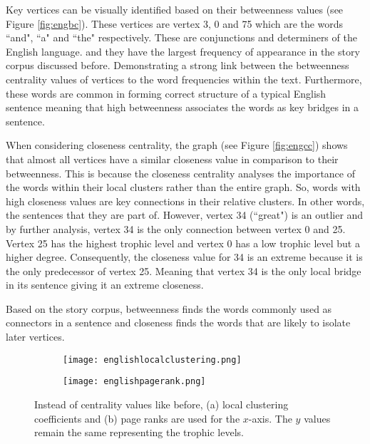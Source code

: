Key vertices can be visually identified based on their betweenness values (see Figure \ref{fig:engbc}). These vertices are vertex 3, 0 and 75 which are the words ``and", ``a" and ``the" respectively. These are conjunctions and determiners of the English language. and they have the largest frequency of appearance in the story corpus discussed before. Demonstrating a strong link between the betweenness centrality values of vertices to the word frequencies within the text. Furthermore, these words are common in forming correct structure of a typical English sentence meaning that high betweenness associates the words as key bridges in a sentence. 

When considering closeness centrality, the graph (see Figure \ref{fig:engcc}) shows that almost all vertices have a similar closeness value in comparison to their betweenness. This is because the closeness centrality analyses the importance of the words within their local clusters rather than the entire graph. So, words with high closeness values are key connections in their relative clusters. In other words, the sentences that they are part of. However, vertex 34 (``great") is an outlier and by further analysis, vertex 34 is the only connection between vertex 0 and 25. Vertex 25 has the highest trophic level and vertex 0 has a low trophic level but a higher degree. Consequently, the closeness value for 34 is an extreme because it is the only predecessor of vertex 25. Meaning that vertex 34 is the only local bridge in its sentence giving it an extreme closeness.

Based on the story corpus, betweenness finds the words commonly used as connectors in a sentence and closeness finds the words that are likely to isolate later vertices.

\begin{figure}[!htb]
\centering
\begin{subfigure}{.45\textwidth}
	\hspace{-1cm} 
	\texttt{[image: englishlocalclustering.png]}
	\caption{}
	\label{fig:englc}
\end{subfigure}
\hfill
\begin{subfigure}{.45\textwidth}
	\hspace{-1cm} 
	\texttt{[image: englishpagerank.png]}
	\caption{}
	\label{fig:engpr}
\end{subfigure}
\caption{Instead of centrality values like before, (a) local clustering coefficients and (b) page ranks are used for the $x$-axis. The $y$ values remain the same representing the trophic levels.}
\end{figure}

